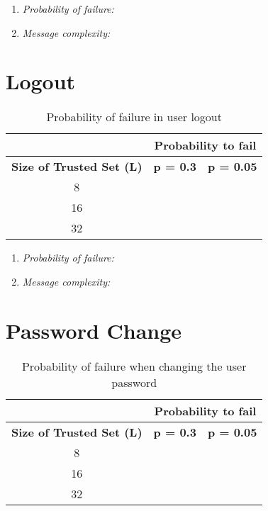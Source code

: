   \begin{enumerate}
    \item{\textit{Probability of failure:}}
    \item{\textit{Message complexity:}}
  \end{enumerate}

\section{Logout}
  \label{sec:eval_logout}
  \begin{table}
    \centering
    \footnotesize
    \begin{tabular}{|c|c|c|}
      \cline{2-3}
      \multicolumn{1}{c|}{}&  \multicolumn{2}{c|}{\textbf{Probability to fail}} \\ \cline{2-3}
      \hline
      \textbf{Size of Trusted Set (L)} & \textbf{p = 0.3} & \textbf{p = 0.05} \\
      \hline \hline
      8 &  &  \\
      \hline
      16 &  &  \\
      \hline
      32 &  &  \\
      \hline
    \end{tabular}
    \caption{Probability of failure in user logout}
    \label{tab:p_logout}
  \end{table}
  
  \begin{enumerate}
    \item{\textit{Probability of failure:}}
    \item{\textit{Message complexity:}}
  \end{enumerate}

\section{Password Change}
  \label{sec:eval_password_change}
  \begin{table}
    \centering
    \footnotesize
    \begin{tabular}{|c|c|c|}
      \cline{2-3}
      \multicolumn{1}{c|}{}&  \multicolumn{2}{c|}{\textbf{Probability to fail}} \\ \cline{2-3}
      \hline
      \textbf{Size of Trusted Set (L)} & \textbf{p = 0.3} & \textbf{p = 0.05} \\
      \hline \hline
      8 &  &  \\
      \hline
      16 &  &  \\
      \hline
      32 &  &  \\
      \hline
    \end{tabular}
    \caption{Probability of failure when changing the user password}
    \label{tab:p_password_change}
  \end{table}
  
